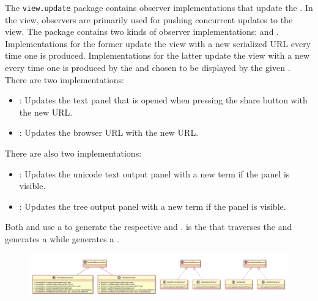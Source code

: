The \texttt{view.update} package contains observer implementations that update the \texttt{}. In the view, observers are primarily used for pushing concurrent updates to the view.
The package contains two kinds of observer implementations: \texttt{} and \texttt{}. 
Implementations for the former update the view with a new serialized URL every time one is produced. 
Implementations for the latter update the view with a new \texttt{} every time one is produced by the \texttt{} and chosen to be displayed by the given \texttt{}.
There are two \texttt{} implementations:
\begin{itemize}
	\item \texttt{}: Updates the text panel that is opened when pressing the share button with the new URL.
	\item \texttt{}: Updates the browser URL with the new URL.
\end{itemize}
There are also two \texttt{} implementations:
\begin{itemize}
	\item \texttt{}: Updates the unicode text output panel with a new term if the panel is visible.
	\item \texttt{}: Updates the tree output panel with a new term if the panel is visible.
\end{itemize}
Both \texttt{} and \texttt{} use a \texttt{} to generate the respective \texttt{} and \texttt{}.
\texttt{} is the \texttt{} that traverses the \texttt{} and generates a \texttt{} while \texttt{} generates a \texttt{}.

\begin{figure}[H]
	\centering
	\includegraphics[width=\textwidth]{packageDiagrams/updatePackage}
\end{figure}
